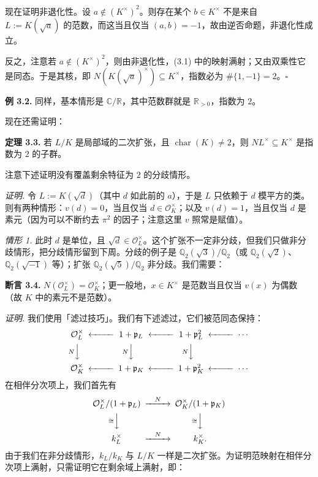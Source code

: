 现在证明非退化性。设 $a\notin(K^{\times})^2$。则存在某个 $b\in K^{\times}$ 不是来自 $L:=K(\sqrt{a})$ 的范数，而这当且仅当 $(a,b)=-1$，故由逆否命题，非退化性成立。

反之，注意若 $a\notin(K^{\times})^2$，则由非退化性，(3.1) 中的映射满射；又由双乘性它是同态。于是其核，即 $N(K(\sqrt{a})^{\times})\subseteq K^{\times}$，指数必为 $\#\{1,-1\}=2$。\hfill$\square$

\textbf{例 3.2.} 同样，基本情形是 $\mathbb{C}/\mathbb{R}$，其中范数群就是 $\mathbb{R}_{>0}$，指数为 $2$。

现在还需证明：

\textbf{定理 3.3.} 若 $L/K$ 是局部域的二次扩张，且 $\operatorname{char}(K)\neq 2$，则 $NL^{\times}\subseteq K^{\times}$ 是指数为 $2$ 的子群。

注意下述证明没有覆盖剩余特征为 $2$ 的分歧情形。

\textit{证明.} 令 $L:=K(\sqrt{d})$（其中 $d$ 如此前的 $a$），于是 $L$ 只依赖于 $d$ 模平方的类。则有两种情形：$v(d)=0$，当且仅当 $d\in\mathcal{O}_K^{\times}$；以及 $v(d)=1$，当且仅当 $d$ 是素元（因为可以不断约去 $\pi^2$ 的因子；注意这里 $v$ 照常是赋值）。

\emph{情形 1.} 此时 $d$ 是单位，且 $\sqrt{d}\in\mathcal{O}_L^{\times}$。这个扩张不一定非分歧，但我们只做非分歧情形，把分歧情形留到下周。分歧的例子是 $\mathbb{Q}_2(\sqrt{3})/\mathbb{Q}_2$（或 $\mathbb{Q}_2(\sqrt{2})$、$\mathbb{Q}_2(\sqrt{-1})$ 等）；扩张 $\mathbb{Q}_2(\sqrt{5})/\mathbb{Q}_2$ 非分歧。我们需要：

\textbf{断言 3.4.} $N(\mathcal{O}_L^{\times})=\mathcal{O}_K^{\times}$；更一般地，$x\in K^{\times}$ 是范数当且仅当 $v(x)$ 为偶数（故 $K$ 中的素元不是范数）。

\textit{证明.} 我们使用「滤过技巧」。我们有下述滤过，它们被范同态保持：
\[
  \begin{CD}
    \mathcal{O}_L^{\times} @<<< 1+\mathfrak{p}_L @<<< 1+\mathfrak{p}_L^2 @<<< \cdots\\
    @V{N}VV @V{N}VV @V{N}VV\\
    \mathcal{O}_K^{\times} @<<< 1+\mathfrak{p}_K @<<< 1+\mathfrak{p}_K^2 @<<< \cdots
  \end{CD}
\]
在相伴分次项上，我们首先有
\[
  \begin{CD}
    \mathcal{O}_L^{\times}/(1+\mathfrak{p}_L) @>{N}>> \mathcal{O}_K^{\times}/(1+\mathfrak{p}_K)\\
    @V{\cong}VV @V{\cong}VV\\
    k_L^{\times} @>{N}>> k_K^{\times}.
  \end{CD}
\]
由于我们在非分歧情形，$k_L/k_K$ 与 $L/K$ 一样是二次扩张。为证明范映射在相伴分次项上满射，只需证明它在剩余域上满射，即：

